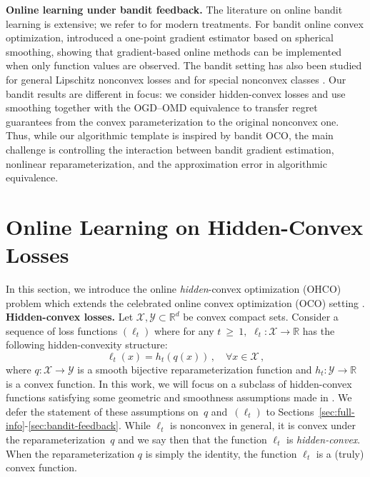 \documentclass[a4paper,11pt,fullpage]{article}
\def\X{{\mathcal X}}
\def\Y{{\mathcal Y}}
\theoremstyle{plain}
\theoremstyle{definition}
\theoremstyle{plain}
\renewcommand{\geq}{~\ge~}
\begin{document}
\noindent\textbf{Online learning under bandit feedback.}
The literature on online bandit learning is extensive; we refer to \citet{lattimore-szepesvari20,lattimore24banditCO} for modern treatments. 
For bandit online convex optimization, \citet{flaxman-kalai-mcmahan05} introduced a one-point gradient estimator based on spherical smoothing, showing that gradient-based online methods can be implemented when only function values are observed. 
The bandit setting has also been studied for general Lipschitz nonconvex losses and for special nonconvex classes \citep{zhang-et-al15,gao-li-zhang18}. 
Our bandit results are different in focus: we consider hidden-convex losses and use smoothing together with the OGD--OMD equivalence to transfer regret guarantees from the convex parameterization to the original nonconvex one. 
Thus, while our algorithmic template is inspired by bandit OCO, the main challenge is controlling the interaction between bandit gradient estimation, nonlinear reparameterization, and the approximation error in algorithmic equivalence.

\section{Online Learning on Hidden-Convex Losses} 
\label{sec:OHCO}

In this section, we introduce the online \textit{hidden}-convex optimization (OHCO) problem which extends the
celebrated online convex optimization (OCO) setting \citep{shalev-shwartz12oco-ftml,hazan-et-al15beyond-cvx,orabona19book-online-learning}.\\ 

\noindent\textbf{Hidden-convex losses.} Let $\X, \Y \subset \mathbb{R}^d$ be convex compact sets. Consider a sequence of loss functions $(\ell_t)$ where for any $t \geq 1,$ $\ell_t: \X \to \mathbb{R}$ 
has the following hidden-convexity structure: 
\begin{equation}
    \label{eq:hidden-convex}
\ell_t(x) = h_t(q(x))\,, \quad \forall x \in \X\,, 
\end{equation}
where $q: \X \to \Y$ is a smooth bijective reparameterization function and $h_t: \Y \to \mathbb{R}$ is a convex function. 
In this work, we will focus on a subclass of hidden-convex functions satisfying some geometric and smoothness assumptions made in \citet{ghai-lu-hazan22}. 
We defer the statement of these assumptions on~$q$ and~$(\ell_t)$ to Sections~\ref{sec:full-info}-\ref{sec:bandit-feedback}. 
While $\ell_t$ is nonconvex in general, it is convex under the  reparameterization~$q$ and we say then that the function $\ell_t$ is \textit{hidden-convex}.  
When the reparameterization $q$ is simply the identity, the function $\ell_t$ is a (truly) convex function.\\ 
\end{document}
